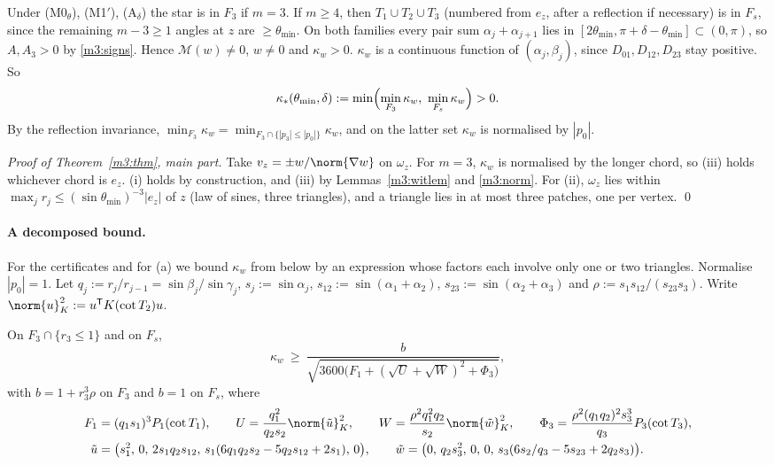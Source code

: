 Under (M0$_\theta$), (M1$'$), (A$_\delta$) the star is in $F_3$ if $m=3$. If $m\ge4$, then $T_1\cup T_2\cup T_3$ (numbered from $e_z$, after a reflection if necessary) is in $F_s$, since the remaining $m-3\ge1$ angles at $z$ are $\ge\theta_{\min}$. On both families every pair sum $\alpha_j+\alpha_{j+1}$ lies in $[2\theta_{\min},\pi+\delta-\theta_{\min}]\subset(0,\pi)$, so $A,A_3>0$ by \eqref{m3:signs}. Hence $\mathcal M(w)\ne0$, $w\ne0$ and $\kappa_w>0$. $\kappa_w$ is a continuous function of $(\alpha_j,\beta_j)$, since $D_{01},D_{12},D_{23}$ stay positive. So
\[
\kappa_\ast(\theta_{\min},\delta):=\min\Bigl(\min_{F_3}\kappa_w,\ \min_{F_s}\kappa_w\Bigr)>0 .
\]
By the reflection invariance, $\min_{F_3}\kappa_w=\min_{F_3\cap\{|p_3|\le|p_0|\}}\kappa_w$, and on the latter set $\kappa_w$ is normalised by $|p_0|$.

\emph{Proof of Theorem~\ref{m3:thm}, main part.} Take $v_z=\pm w/\norm{\nabla w}$ on $\omega_z$. For $m=3$, $\kappa_w$ is normalised by the longer chord, so (iii) holds whichever chord is $e_z$. (i) holds by construction, and (iii) by Lemmas~\ref{m3:witlem} and \ref{m3:norm}. For (ii), $\omega_z$ lies within $\max_jr_j\le(\sin\theta_{\min})^{-3}|e_z|$ of $z$ (law of sines, three triangles), and a triangle lies in at most three patches, one per vertex. \qed

\paragraph{A decomposed bound.}
For the certificates and for (a) we bound $\kappa_w$ from below by an expression whose factors each involve only one or two triangles. Normalise $|p_0|=1$. Let $q_j:=r_j/r_{j-1}=\sin\beta_j/\sin\gamma_j$, $s_j:=\sin\alpha_j$, $s_{12}:=\sin(\alpha_1+\alpha_2)$, $s_{23}:=\sin(\alpha_2+\alpha_3)$ and $\rho:=s_1s_{12}/(s_{23}s_3)$. Write $\norm{u}_K^2:=u^{\mathsf T}K(\cot T_2)u$.

\begin{lemma}[Decomposition]\label{m3:dec}
On $F_3\cap\{r_3\le1\}$ and on $F_s$,
\[
\kappa_w\ \ge\ \frac{b}{\sqrt{3600\bigl(F_1+(\sqrt U+\sqrt W)^2+\Phi_3\bigr)}},
\]
with $b=1+r_3^3\rho$ on $F_3$ and $b=1$ on $F_s$, where
\begin{align*}
F_1&=(q_1s_1)^3P_1(\cot T_1),\qquad U=\frac{q_1^2}{q_2s_2}\norm{\tilde u}_K^2,\qquad W=\frac{\rho^2q_1^2q_2}{s_2}\norm{\tilde w}_K^2,\qquad \Phi_3=\frac{\rho^2(q_1q_2)^2s_3^3}{q_3}P_3(\cot T_3),\\
\tilde u&=\bigl(s_1^2,\,0,\,2s_1q_2s_{12},\,s_1(6q_1q_2s_2-5q_2s_{12}+2s_1),\,0\bigr),\qquad \tilde w=\bigl(0,\,q_2s_3^2,\,0,\,0,\,s_3(6s_2/q_3-5s_{23}+2q_2s_3)\bigr).
\end{align*}
\end{lemma}

